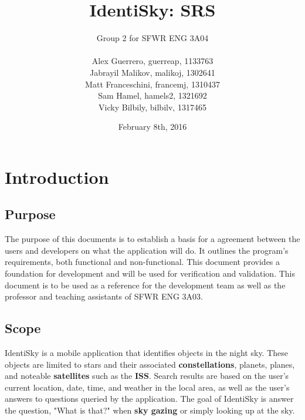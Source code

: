 \documentclass[]{article}
\title{IdentiSky: SRS}
\author{Group 2 for SFWR ENG 3A04 \\
\\ 
Alex Guerrero, guerreap, 1133763 \\
Jabrayil Malikov, malikoj, 1302641 \\
Matt Franceschini, francemj, 1310437 \\
Sam Hamel, hamels2, 1321692 \\
Vicky Bilbily, bilbilv, 1317465 \\
}
\date{February 8th, 2016}
\begin{document}
\maketitle
\newpage
\tableofcontents
\newpage


\section{Introduction}
\label{sec:introduction}

\subsection{Purpose}
\label{sub:purpose}
The purpose of this documents is to establish a basis for a agreement between the users and developers on what the application will do. It outlines the program's requirements, both functional and non-functional. This document provides a foundation for development and will be used for verification and validation. This document is to be used as a reference for the development team as well as the professor and teaching assistants of SFWR ENG 3A03. 

\subsection{Scope}
\label{sub:scope}
IdentiSky is a mobile application that identifies objects in the night sky. These objects are limited to stars and their associated \textbf{constellations}, planets, planes, and noteable \textbf{satellites} such as the \textbf{ISS}. Search results are based on the user's current location, date, time, and weather in the local area, as well as the user's answers to questions queried by the application. The goal of IdentiSky is answer the question, "What is that?" when \textbf{sky gazing} or simply looking up at the sky. 
\end{document}
